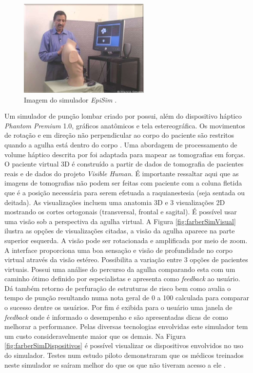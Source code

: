 \begin{figure}[ht!]
    \centering
    \includegraphics[width=0.4\linewidth]{capitulos/figuras/epiSim.png} 
    \caption{Imagem do simulador \textit{EpiSim} \cite{Frazzetto2011}.}
    \label{fig:epiSim}
\end{figure}

Um simulador de punção lombar criado por \textcite{Farber2008}  possui, além do dispositivo háptico \textit{Phantom Premium} 1.0, gráficos anatômicos e tela estereográfica. Os movimentos de rotação e em direção não perpendicular ao corpo do paciente são restritos quando a agulha está dentro do corpo \cite{Farber2008, Farber2009}. Uma abordagem de processamento de volume háptico descrita por \textcite{Lundin2005} foi adaptada para mapear as tomografias em forças. O paciente virtual 3D é construído a partir de dados de tomografia de pacientes reais e de dados do projeto \textit{Visible Human}. É importante ressaltar aqui que as imagens de tomografias não podem ser feitas com paciente com a coluna fletida que é a posição necessária para serem efetuada a raquianestesia (seja sentada ou deitada).  As visualizações incluem uma anatomia 3D e 3 visualizações 2D mostrando os cortes ortogonais (transversal, frontal e sagital). É possível usar uma visão sob a perspectiva da agulha virtual. A Figura \ref{fig:farberSimVisual} ilustra as opções de visualizações citadas, a visão da agulha aparece na parte superior esquerda. A visão pode ser rotacionada e amplificada por meio de zoom. A interface proporciona uma boa sensação e visão de  profundidade no corpo virtual através da visão estéreo. Possibilita a variação entre 3 opções de pacientes virtuais. Possui uma análise do percurso da agulha comparando esta com um caminho ótimo definido por especialistas e apresenta como \textit{feedback} ao usuário. Dá também retorno de perfuração de estruturas de risco bem como avalia o tempo de punção resultando numa nota geral de 0 a 100 calculada para comparar o sucesso dentre os usuários. Por fim é exibida para o usuário uma janela de \textit{feedback} onde é informado o desempenho e são apresentadas dicas de como melhorar a performance. Pelas diversas tecnologias envolvidas este simulador tem um custo consideravelmente maior que os demais. Na Figura \ref{fig:farberSimDispositivos} é possível visualizar os dispositivos envolvidos no uso do simulador. Testes num estudo piloto demonstraram que os médicos treinados neste simulador se saíram melhor do que os que não tiveram acesso a ele \cite{Farber2009}.

